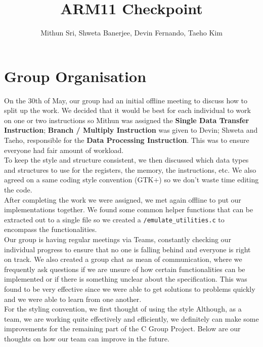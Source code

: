 \documentclass[11pt]{article}
\begin{document}
\title{ARM11 Checkpoint}
\author{Mithun Sri, Shweta Banerjee, Devin Fernando, Taeho Kim}

\maketitle
\section{Group Organisation}

\-\hspace{1cm}On the 30th of May, our group had an initial offline meeting to discuss how to split up the work. We decided that it would be best for each individual to work on one or two instructions so Mithun was assigned the {\bf Single Data Transfer Instruction}; {\bf Branch / Multiply Instruction} was given to Devin; Shweta and Taeho, responsible for the {\bf Data Processing Instruction}. This was to ensure everyone had fair amount of workload. \\
\-\hspace{1cm}To keep the style and structure consistent, we then discussed which data types and structures to use for the registers, the memory, the instructions, etc. We also agreed on a same coding style convention (GTK+) so we don't waste time editing the code. \\
\-\hspace{1cm}After completing the work we were assigned, we met again offline to put our implementations together. We found some common helper functions that can be extracted out to a single file so we created a \texttt{/emulate\_utilities.c} to encompass the functionalities. \\
\-\hspace{1cm}Our group is having regular meetings via Teams, constantly checking our individual progress to ensure that no one is falling behind and everyone is right on track. We also created a group chat as mean of communication, where we frequently ask questions if we are unsure of how certain functionalities can be implemented or if there is something unclear about the specification. This was found to be very effective since we were able to get solutions to problems quickly and we were able to learn from one another.\\
\-\hspace{1cm}For the styling convention, we first thought of using the style 
\-\hspace{1cm}Although, as a team, we are working quite effectively and efficiently, we definitely can make some improvements for the remaining part of the C Group Project. Below are our thoughts on how our team can improve in the future.
\end{document}
